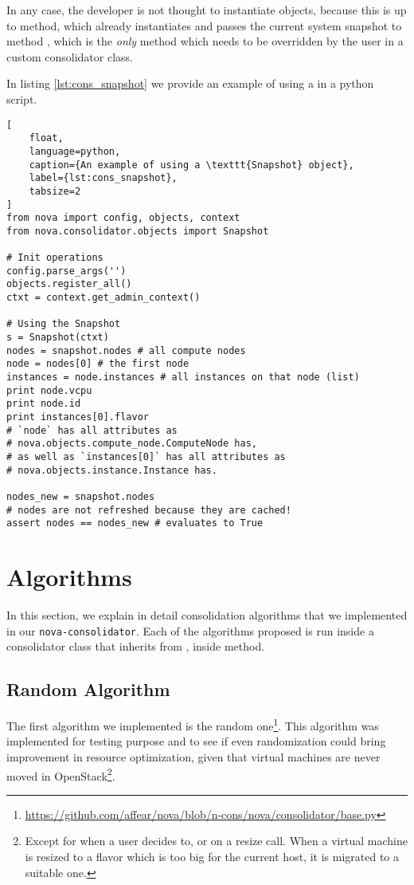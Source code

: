In any case, the developer is not thought to instantiate  objects, because this is up to  method, which already instantiates and passes the current system snapshot to method , which is the \emph{only} method which needs to be overridden by the user in a custom consolidator class.

In listing \ref{lst:cons_snapshot} we provide an example of using a  in a python script.

\begin{lstlisting}[
	float,
	language=python,
	caption={An example of using a \texttt{Snapshot} object},
	label={lst:cons_snapshot},
	tabsize=2
]
from nova import config, objects, context
from nova.consolidator.objects import Snapshot

# Init operations
config.parse_args('')
objects.register_all()
ctxt = context.get_admin_context()

# Using the Snapshot
s = Snapshot(ctxt)
nodes = snapshot.nodes # all compute nodes
node = nodes[0] # the first node
instances = node.instances # all instances on that node (list)
print node.vcpu
print node.id
print instances[0].flavor
# `node` has all attributes as
# nova.objects.compute_node.ComputeNode has,
# as well as `instances[0]` has all attributes as
# nova.objects.instance.Instance has.

nodes_new = snapshot.nodes
# nodes are not refreshed because they are cached!
assert nodes == nodes_new # evaluates to True
\end{lstlisting}

\section{Algorithms}
\label{sec:cons_algs}
In this section, we explain in detail consolidation algorithms that we implemented in our \texttt{nova-consolidator}. Each of the algorithms proposed is run inside a consolidator class that inherits from , inside  method.

\subsection{Random Algorithm}
\label{sub:algs_rnd}
The first algorithm we implemented is the random one\footnote{\url{https://github.com/affear/nova/blob/n-cons/nova/consolidator/base.py}}. This algorithm was implemented for testing purpose and to see if even randomization could bring improvement in resource optimization, given that virtual machines are never moved in OpenStack\footnote{Except for when a user decides to, or on a resize call. When a virtual machine is resized to a flavor which is too big for the current host, it is migrated to a suitable one.}.

